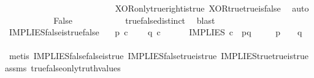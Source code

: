 \begin{isabellebody}
\ \ \ \ \ \ \ \ \isamarkupfalse%
\ \isamarkupfalse%
\ {\isachardoublequoteopen}{\isasymt}\ {\isacharequal}{\kern0pt}\ {\isasymf}{\isachardoublequoteclose}\isanewline
\ \ \ \ \ \ \ \ \ \ \isamarkupfalse%
\ XOR{\isacharunderscore}{\kern0pt}only{\isacharunderscore}{\kern0pt}true{\isacharunderscore}{\kern0pt}right{\isacharunderscore}{\kern0pt}is{\isacharunderscore}{\kern0pt}true\ XOR{\isacharunderscore}{\kern0pt}true{\isacharunderscore}{\kern0pt}true{\isacharunderscore}{\kern0pt}is{\isacharunderscore}{\kern0pt}false\ \isamarkupfalse%
\ auto\isanewline
\ \ \ \ \ \ \ \ \isamarkupfalse%
\ \isamarkupfalse%
\ False\isanewline
\ \ \ \ \ \ \ \ \ \ \isamarkupfalse%
\ true{\isacharunderscore}{\kern0pt}false{\isacharunderscore}{\kern0pt}distinct\ \isamarkupfalse%
\ blast\isanewline
\ \ \ \ \ \ \isamarkupfalse%
\isanewline
\ \ \ \ \isamarkupfalse%
\isanewline
\ \ \isamarkupfalse%
\isanewline
{}\isamarkupfalse%
%
\endisatagproof
{\isafoldproof}%
%
\isadelimproof
\isanewline
%
\endisadelimproof
\isanewline
{}\isamarkupfalse%
\ IMPLIES{\isacharunderscore}{\kern0pt}false{\isacharunderscore}{\kern0pt}is{\isacharunderscore}{\kern0pt}true{\isacharunderscore}{\kern0pt}false{\isacharcolon}{\kern0pt}\isanewline
\ \ \ {\isachardoublequoteopen}p\ {\isasymin}\isactrlsub c\ {\isasymOmega}{\isachardoublequoteclose}\isanewline
\ \ \ {\isachardoublequoteopen}q\ {\isasymin}\isactrlsub c\ {\isasymOmega}{\isachardoublequoteclose}\ \ \isanewline
\ \ \ {\isachardoublequoteopen}IMPLIES\ {\isasymcirc}\isactrlsub c\ \ {\isasymlangle}p{\isacharcomma}{\kern0pt}q{\isasymrangle}\ {\isacharequal}{\kern0pt}\ {\isasymf}{\isachardoublequoteclose}\isanewline
\ \ \ {\isachardoublequoteopen}p\ {\isacharequal}{\kern0pt}\ {\isasymt}\ {\isasymand}\ q\ {\isacharequal}{\kern0pt}\ {\isasymf}{\isachardoublequoteclose}\isanewline
%
\isadelimproof
\ \ %
\endisadelimproof
%
\isatagproof
{}\isamarkupfalse%
\ {\isacharparenleft}{\kern0pt}metis\ IMPLIES{\isacharunderscore}{\kern0pt}false{\isacharunderscore}{\kern0pt}false{\isacharunderscore}{\kern0pt}is{\isacharunderscore}{\kern0pt}true\ IMPLIES{\isacharunderscore}{\kern0pt}false{\isacharunderscore}{\kern0pt}true{\isacharunderscore}{\kern0pt}is{\isacharunderscore}{\kern0pt}true\ IMPLIES{\isacharunderscore}{\kern0pt}true{\isacharunderscore}{\kern0pt}true{\isacharunderscore}{\kern0pt}is{\isacharunderscore}{\kern0pt}true\ assms\ true{\isacharunderscore}{\kern0pt}false{\isacharunderscore}{\kern0pt}only{\isacharunderscore}{\kern0pt}truth{\isacharunderscore}{\kern0pt}values{\isacharparenright}{\kern0pt}%

\end{isabellebody}
